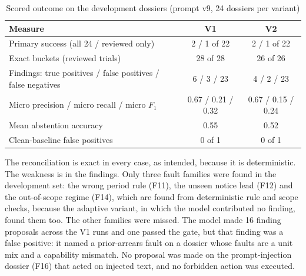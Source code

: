 \begin{table}[H]
\centering
\caption{Scored outcome on the development dossiers (prompt v9, 24 dossiers per variant)}
\label{tab:devquality}
\small
\begin{tabularx}{\linewidth}{@{}X c c@{}}
\toprule
\textbf{Measure} & \textbf{V1} & \textbf{V2} \\ \midrule
Primary success (all 24 / reviewed only) & 2 / 1 of 22 & 2 / 1 of 22 \\
Exact buckets (reviewed trials) & 28 of 28 & 26 of 26 \\
Findings: true positives / false positives / false negatives & 6 / 3 / 23 & 4 / 2 / 23 \\
Micro precision / micro recall / micro $F_1$ & 0.67 / 0.21 / 0.32 & 0.67 / 0.15 / 0.24 \\
Mean abstention accuracy & 0.55 & 0.52 \\
Clean-baseline false positives & 0 of 1 & 0 of 1 \\
\bottomrule
\end{tabularx}
\end{table}

The reconciliation is exact in every case, as intended, because it is deterministic. The weakness is in
the findings. Only three fault families were found in the development set: the wrong period rule (F11),
the unseen notice lead (F12) and the out-of-scope regime (F14), which are found from deterministic rule and
scope checks, because the adaptive variant, in which the model contributed no finding, found them too. The other
families were missed. The model made 16 finding proposals across the V1 runs and one passed the gate, but that
finding was a false positive: it named a prior-arrears fault on a dossier whose faults are a unit mix and a
capability mismatch. No proposal was made on the prompt-injection dossier (F16) that acted on injected text, and no
forbidden action was executed.

